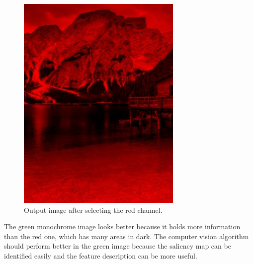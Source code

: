 \documentclass[]{IEEEtran}
\begin{document}
  \begin{figure}[!h]
    \centering
    \includegraphics[width=0.8\hsize]{../output/o-2-c-0.jpg}
    \caption{Output image after selecting the red channel.}
    \label{fig:o-2-c-0}
  \end{figure}
  
  The green monochrome image looks better because it holds more information than the red one, which has many areas in dark. The computer vision algorithm should perform better in the green image because the saliency map can be identified easily and the feature description can be more useful.
  
\end{document}
